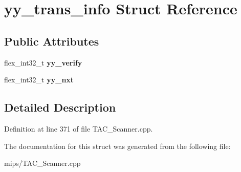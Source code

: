 \hypertarget{structyy__trans__info}{\section{yy\-\_\-trans\-\_\-info Struct Reference}
\label{structyy__trans__info}
}
\subsection*{Public Attributes}
\begin{DoxyCompactItemize}
\item 
\hypertarget{structyy__trans__info_a5c9f61e770deef50bd4e697310342fe9}{flex\-\_\-int32\-\_\-t {\bfseries yy\-\_\-verify}}\label{structyy__trans__info_a5c9f61e770deef50bd4e697310342fe9}

\item 
\hypertarget{structyy__trans__info_ae0715250c2bef261e596e77e0030f13e}{flex\-\_\-int32\-\_\-t {\bfseries yy\-\_\-nxt}}\label{structyy__trans__info_ae0715250c2bef261e596e77e0030f13e}

\end{DoxyCompactItemize}


\subsection{Detailed Description}


Definition at line 371 of file T\-A\-C\-\_\-\-Scanner.\-cpp.



The documentation for this struct was generated from the following file\-:\begin{DoxyCompactItemize}
\item 
mips/T\-A\-C\-\_\-\-Scanner.\-cpp\end{DoxyCompactItemize}
